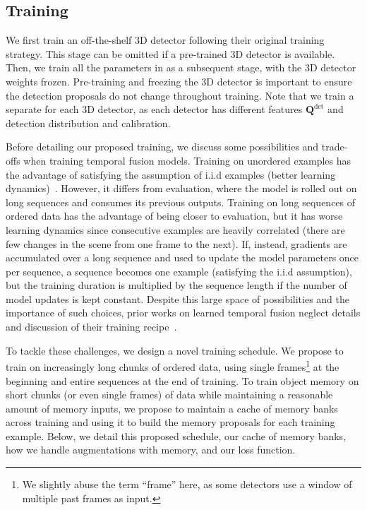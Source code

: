 

\subsection{Training} \label{sec:method-training}


We first train an off-the-shelf 3D detector following their original training strategy.
This stage can be omitted if a pre-trained 3D detector is available.
Then, we train all the parameters in \ourmodel{} as a subsequent stage,
with the 3D detector weights frozen.
Pre-training and freezing the 3D detector
is important to ensure the detection proposals
do not change throughout \ourmodel{} training.
Note that we train a separate \ourmodel{} for each 3D detector,
as each detector has different features $\mathbf{Q}^{\textrm{det}}$ and detection distribution and calibration.

Before detailing our proposed \ourmodel{} training, we discuss some possibilities and trade-offs when training temporal fusion models.
Training on unordered examples has the advantage of
satisfying the assumption of i.i.d examples (better learning dynamics)~\cite{kiefer1952stochastic,robbins1951stochastic}.
However, it differs from evaluation, where the model is rolled out on long sequences and consumes its previous outputs.
Training on long sequences of ordered data has the advantage of being closer to evaluation, but it has worse learning dynamics since consecutive examples are heavily correlated (there are few changes in the scene from one frame to the next).
If, instead, gradients are accumulated over a long sequence and used to update the model parameters once per sequence, a sequence becomes one example (satisfying the i.i.d assumption), but the
training duration is multiplied by the sequence length if the number of model updates is kept constant.
Despite this large space of possibilities and the importance of such choices, prior works on learned temporal fusion neglect details and discussion of their training recipe~\cite{he2023lef,li2023modar,huang2024ptt,he2023msf}.

To tackle these challenges, we design a novel training schedule.
We propose to train \ourmodel{} on increasingly long chunks of ordered data, using single frames\footnote{We slightly abuse the term ``frame'' here, as some detectors use a window of multiple past frames as input.}
at the beginning and entire sequences at the end of training.
To train object memory on short chunks (or even single frames) of data while maintaining a reasonable amount of memory inputs,
we propose to maintain a cache of memory banks across training and using it to build the memory proposals for each training example.
Below, we detail this proposed schedule, our cache of memory banks, how we handle augmentations with memory, and our loss function.

